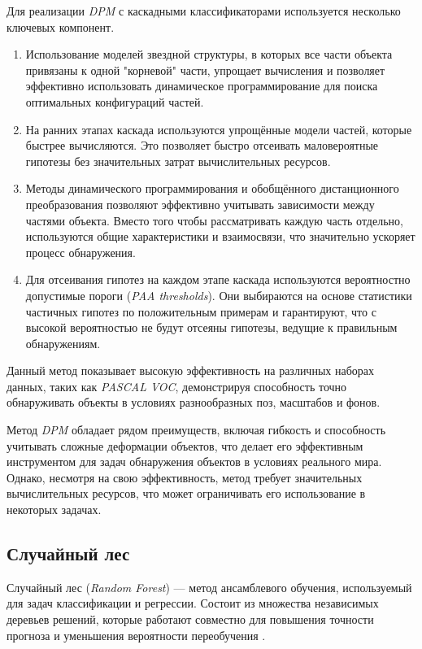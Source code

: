Для реализации \textit{DPM} с каскадными классификаторами используется несколько ключевых компонент.
\begin{enumerate}[1.]
    \item Использование моделей звездной структуры, в которых все части объекта привязаны к одной "корневой" части, упрощает вычисления и позволяет эффективно использовать динамическое программирование для поиска оптимальных конфигураций частей.
    \item На ранних этапах каскада используются упрощённые модели частей, которые быстрее вычисляются. Это позволяет быстро отсеивать маловероятные гипотезы без значительных затрат вычислительных ресурсов.
    \item Методы динамического программирования и обобщённого дистанционного преобразования позволяют эффективно учитывать зависимости между частями объекта. Вместо того чтобы рассматривать каждую часть отдельно, используются общие характеристики и взаимосвязи, что значительно ускоряет процесс обнаружения.
    \item Для отсеивания гипотез на каждом этапе каскада используются вероятностно допустимые пороги (\textit{PAA thresholds}). Они выбираются на основе статистики частичных гипотез по положительным примерам и гарантируют, что с высокой вероятностью не будут отсеяны гипотезы, ведущие к правильным обнаружениям.
\end{enumerate}

Данный метод показывает высокую эффективность на различных наборах данных, таких как \textit{PASCAL VOC}, демонстрируя способность точно обнаруживать объекты в условиях разнообразных поз, масштабов и фонов. 

Метод \textit{DPM} обладает рядом преимуществ, включая гибкость и способность учитывать сложные деформации объектов, что делает его эффективным инструментом для задач обнаружения объектов в условиях реального мира. Однако, несмотря на свою эффективность, метод требует значительных вычислительных ресурсов, что может ограничивать его использование в некоторых задачах. 

\subsection{Случайный лес}
Случайный лес (\textit{Random Forest}) — метод ансамблевого обучения, используемый для задач классификации и регрессии. Состоит из множества независимых деревьев решений, которые работают совместно для повышения точности прогноза и уменьшения вероятности переобучения \cite{random-forest}.

